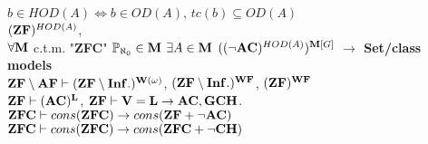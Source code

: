 \documentclass[9pt]{article}
\newcommand{\class}[1]{{\bf #1}}
\newcommand{\Pp}{\mathbb{P}}
\newcommand{\mytitle}[1]{ {\bf $\rightarrow$ #1}\\}
\newcommand{\V}{\class{V}}
\newcommand{\M}{\class{M}}
\newcommand{\WF}{\class{WF}}
\begin{document}
\begin{multicols*}{2}
$b\in HOD(A)\Leftrightarrow b\in OD(A),\,tc(b)\subseteq OD(A)$\\
$(\class{ZF})^{HOD(A)}$,\\
$\forall \M$ c.t.m. "\class{ZFC}" $\Pp_{\aleph_0}\in\M$ $\exists A\in \M$ $((\neg\class{AC})^{HOD(A)})^{\M[G]}$
\mytitle{Set/class models}
$\class{ZF}\setminus \class{AF}\vdash (\class{ZF}\setminus \class{Inf.})^{\class{W}(\omega)}$, $(\class{ZF}\setminus \class{Inf.})^\WF$, $(\class{ZF})^\WF$\\
$\class{ZF}\vdash (\class{AC})^{\class{L}}$, $\class{ZF}\vdash \V=\class{L}\to \class{AC}, \class{GCH}$.\\
$\class{ZFC}\vdash cons(\class{ZFC})\to cons(\class{ZF}+\neg\class{AC})$\\
$\class{ZFC}\vdash cons(\class{ZFC})\to cons(\class{ZFC}+\neg \class{CH})$
\end{multicols*}
\end{document}
